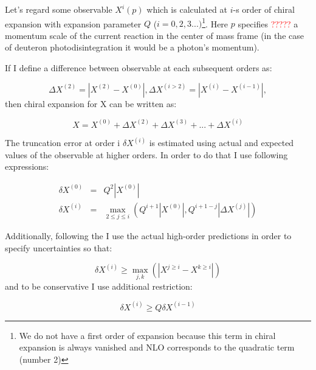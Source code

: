     Let's regard some observable $X^i(p)$ which is calculated at $i$-s order of chiral expansion 
    with expansion parameter $Q$ ($i = 0,2,3...)$\footnote{We do not have a first order of expansion
    because this term in chiral expansion is always vanished
    and NLO  corresponds to the quadratic term (number 2)}.
    Here $p$ specifies
    {\textcolor{red}{?????}} a momentum
    scale of the current reaction in the center of mass frame (in the case of deuteron photodisintegration it would be a
    photon's momentum).  

    If I define a difference between observable at each subsequent orders as:

    \begin{equation}
        \Delta X^{(2)} = |X^{(2)} - X^{(0)}|, \Delta X^{(i>2)} = |X^{(i)} - X^{(i-1)}|,
    \end{equation}
    then chiral expansion for X can be written as:

    \begin{equation}
        X = X^{(0)} + \Delta X^{(2)} + \Delta X^{(3)} + ... + \Delta X^{(i)}
        \label{trunc1}
    \end{equation}
        
    The truncation error at order i $\delta X^{(i)}$ is estimated using actual and expected values of the observable at 
    higher orders. In order to do that I use following expressions:

    \begin{eqnarray}
        \delta X^{(0)} &=& Q^2 \left| X^{(0)} \right| \label{trunc2}\\ 
        \delta X^{(i)} &=& \max_{2 \leq j \leq i} \left( Q^{i+1} \left| X^{(0)} \right|,
        Q^{i+1-j} \left| \Delta X^{(j)} \right| \right) \label{trunc3} 
    \end{eqnarray}

    Additionally, following the \cite{Binder2015} I use the actual high-order predictions 
    in order to specify uncertainties so that:

    \begin{equation}
        \delta X^{(i)} \geq \max_{j,k} (|X^{j \geq i} - X^{k \geq i}|)
        \label{trunc4}
    \end{equation}
    and to be conservative I use additional restriction:

    \begin{equation}
        \delta X^{(i)} \geq Q \delta X^{(i-1)}
        \label{trunc5}
    \end{equation}

